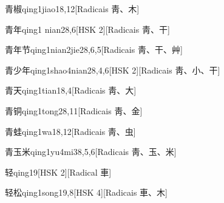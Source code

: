 \begin{entry}{青椒}{qing1jiao1}{8,12}[Radicais ⾭、⽊]
\end{entry}

\begin{entry}{青年}{qing1 nian2}{8,6}[HSK 2][Radicais ⾭、⼲]
\end{entry}

\begin{entry}{青年节}{qing1nian2jie2}{8,6,5}[Radicais ⾭、⼲、⾋]
\end{entry}

\begin{entry}{青少年}{qing1shao4nian2}{8,4,6}[HSK 2][Radicais ⾭、⼩、⼲]
\end{entry}

\begin{entry}{青天}{qing1tian1}{8,4}[Radicais ⾭、⼤]
\end{entry}

\begin{entry}{青铜}{qing1tong2}{8,11}[Radicais ⾭、⾦]
\end{entry}

\begin{entry}{青蛙}{qing1wa1}{8,12}[Radicais ⾭、⾍]
\end{entry}

\begin{entry}{青玉米}{qing1yu4mi3}{8,5,6}[Radicais ⾭、⽟、⽶]
\end{entry}

\begin{entry}{轻}{qing1}{9}[HSK 2][Radical ⾞]
\end{entry}

\begin{entry}{轻松}{qing1song1}{9,8}[HSK 4][Radicais ⾞、⽊]
\end{entry}


